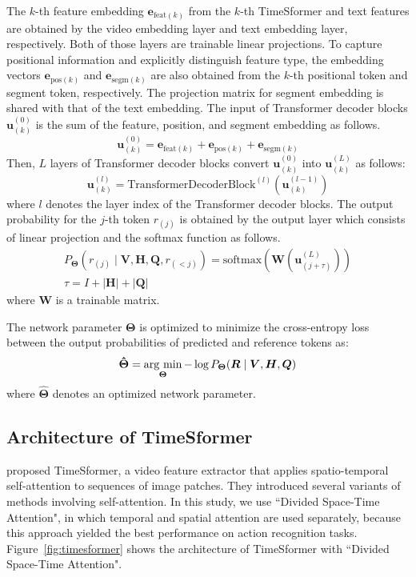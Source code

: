 \documentclass[letterpaper]{article}
\newcommand{\argmin}{\mathop{\rm arg~min}\limits}
\begin{document}
The $k$-th feature embedding $\bm{e}_{\textrm{feat}(k)}$ from the $k$-th TimeSformer and text features are obtained by the video embedding layer and text embedding layer, respectively.
Both of those layers are trainable linear projections.
To capture positional information and explicitly distinguish feature type, the embedding vectors $\bm{e}_{\textrm{pos}(k)}$ and $\bm{e}_{\textrm{segm}(k)}$ are also obtained from the $k$-th positional token and segment token, respectively.
The projection matrix for segment embedding is shared with that of the text embedding.
The input of Transformer decoder blocks $\bm{u}_{(k)}^{(0)}$ is the sum of the feature, position, and segment embedding as follows.
\begin{equation}
  \bm{u}_{(k)}^{(0)} = \bm{e}_{\textrm{feat}(k)} + \bm{e}_{\textrm{pos}(k)} + \bm{e}_{\textrm{segm}(k)}
\end{equation}
Then, $L$ layers of Transformer decoder blocks convert $\bm{u}_{(k)}^{(0)}$ into $\bm{u}_{(k)}^{(L)}$ as follows:
\begin{equation}
  \bm{u}_{(k)}^{(l)} = \textrm{TransformerDecoderBlock}^{(l)}(\bm{u}_{(k)}^{(l-1)})
\end{equation}
where $l$ denotes the layer index of the Transformer decoder blocks.
The output probability for the $j$-th token $r_{(j)}$ is obtained by the output layer which consists of linear projection and the softmax function as follows.
\begin{gather}
  P_{\bm{\Theta}}(r_{(j)} \mid \bm{V}, \bm{H}, \bm{Q}, r_{(<j)}) = \textrm{softmax}(\bm{W}(\bm{u}_{(j+\tau)}^{(L)})) \\
  \tau = I + |\bm{H}| + |\bm{Q}|
\end{gather}
where $\bm{W}$ is a trainable matrix.

The network parameter $\bm{\Theta}$ is optimized to minimize the cross-entropy loss between the output probabilities of predicted and reference tokens as:
\begin{equation}
  \bm{\hat{\Theta}} = \argmin_{\bm{\Theta}}-\log P_{\bm{\Theta}}(\bm{R} \mid \bm{V}, \bm{H}, \bm{Q})
\end{equation}
where $\bm{\hat{\Theta}}$ denotes an optimized network parameter.


\subsection{Architecture of TimeSformer}
\citet{Bertasius2021is} proposed TimeSformer, a video feature extractor that applies spatio-temporal self-attention to sequences of image patches.
They introduced several variants of methods involving self-attention.
In this study, we use ``Divided Space-Time Attention", in which temporal and spatial attention are used separately, because this approach yielded the best performance on action recognition tasks.
Figure~\ref{fig:timesformer} shows the architecture of TimeSformer with ``Divided Space-Time Attention".
\end{document}
